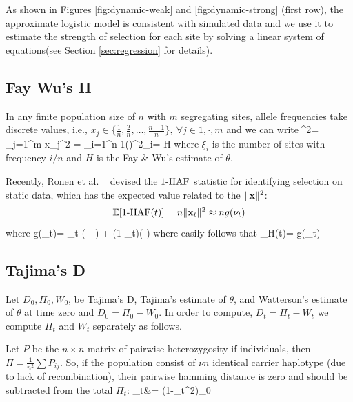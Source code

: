 \documentclass[11pt]{article}
\begin{document}
As shown in Figures \ref{fig:dynamic-weak} and \ref{fig:dynamic-strong} (first 
row), the approximate logistic model is consistent with 
simulated data and we 
use it to estimate the strength of selection for 
each site by solving a linear system of equations(see Section 
\ref{sec:regression} for details).

\subsection{Fay Wu's H}\label{app:h}
\bl
In any finite population size of $n$ with $m$ segregating sites, 
allele frequencies take 
discrete values, i.e.,  $x_j \in 
\{\frac{1}{n},\frac{2}{n},\ldots,\frac{n-1}{n}\}, \ \forall j \in{1,\cdot,m}$ 
and we can write
\beq
\|\bfx\|^2= \sum_{j=1}^{m} x_j^2 = 
\sum_{i=1}^{n-1}\left(\right)^2\xi_i= 
H 
\eeq
where $\xi_i$ is the number of sites with frequency $i/n$ and $H$ is the 
Fay \& Wu's estimate of $\theta$.
\el

Recently, Ronen et al. ~\cite{ronen2015predicting} devised the $1\text{-HAF}$ 
statistic for identifying selection on static data, which has the expected 
value related to the $\|{\mathbf x}\|^2$:
\begin{equation} 
{\mathbb E}[1\text{-HAF}(t)]= n\| {\mathbf x}_t\|^2\approx ng(\nu_t)
\end{equation} 
where
\beq
g(\nu_t)= \theta \nu_t \left( - \right) +
\theta (1-\nu_t)\left(-\right)
\label{eq:hafscorepooled}
\eeq
where easily follows that
\beq
\theta_H(t)= g(\nu_t)
\eeq

\subsection{Tajima's D}\label{app:td}
Let $D_0, \Pi_0, W_0$, be Tajima's D, Tajima's estimate of  $\theta$, and 
Watterson's estimate of $\theta$ at time zero and $D_0=\Pi_0 - W_0$.
In order to compute, $D_t=\Pi_t - W_t$ we compute $\Pi_t$ and $W_t$ separately 
as follows.

Let $P$ be the $n \times n$ matrix of pairwise heterozygosity if individuals, 
then $\Pi=\frac{1}{n^2}\sum P_{ij}$. So, if the population consist of $\nu n$ 
identical carrier haplotype (due to lack of recombination), their pairwise 
hamming distance is zero and should be subtracted from the total $\Pi_t$:
\beq
\Pi_t&= (1-\nu_t^2)\Pi_0 
\eeq
\end{document}
